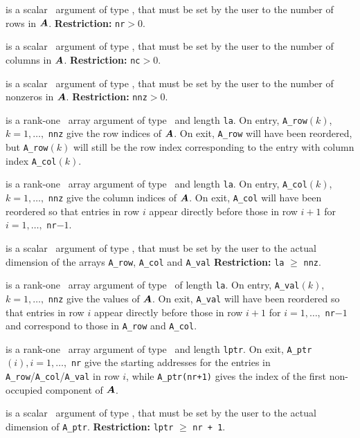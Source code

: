 \documentclass{galahad}
\begin{document}
\begin{description}

 is a scalar \intentin\ argument of type
\integer, that must be set by the user to the number of
rows in ${\bm{A}}$.
{\bf Restriction:} {\tt nr}$ > 0$.

 is a scalar \intentin\ argument of type
\integer, that must be set by the user to the number of
columns in ${\bm{A}}$.
{\bf Restriction:} {\tt nc}$ > 0$.

 is a scalar \intentin\ argument of type
\integer, that must be set by the user to the number of
nonzeros in ${\bm{A}}$.
{\bf Restriction:} {\tt nnz}$ > 0$.

  is a rank-one \intentinout\ array argument of type
\integer\ and length {\tt la}.
On entry, {\tt A\_row}$(k)$, $k = 1, \ldots,$ {\tt nnz} give
the row indices of ${\bm{A}}$. On exit, {\tt A\_row} will have been reordered, but
{\tt A\_row}$(k)$ will still be the row index corresponding to the
entry with column index {\tt A\_col}$(k)$.

  is a rank-one \intentinout\ array argument of type
\integer\ and length {\tt la}.
On entry, {\tt A\_col}$(k)$, $k = 1, \ldots,$ {\tt nnz} give
the column indices of ${\bm{A}}$. On exit, {\tt A\_col}
will have been reordered so that entries in row $i$ appear directly before
those in row $i+1$ for $i = 1, \ldots ,$ {\tt nr}$-1$.

is a scalar \intentin\ argument of type
\integer, that must be set by the user to the actual dimension of the arrays
{\tt A\_row},
{\tt A\_col}
and
{\tt A\_val}
{\bf Restriction:} {\tt la} $\geq$ {\tt nnz}.

is a rank-one \intentinout\ array argument of type
\realdp\ of length {\tt la}.
On entry, {\tt A\_val}$(k)$, $k = 1, \ldots,$ {\tt nnz} give the
values of ${\bm{A}}$.
On exit, {\tt A\_val} will have been reordered so that
entries in row $i$ appear directly before those in row $i+1$ for
$i = 1, \ldots,$ {\tt nr}$-1$ and correspond to those in
{\tt A\_row} and {\tt A\_col}.

  is a rank-one \intentout\ array argument of type
\integer\ and length {\tt lptr}.
On exit, {\tt A\_ptr}$(i), i = 1, \ldots,$ {\tt nr} give
the starting addresses for the entries in {\tt A\_row}/{\tt A\_col}/{\tt A\_val}
in row $i$, while {\tt A\_ptr(nr+1)}
gives the index of the first non-occupied component of ${\bm{A}}$.

 is a scalar \intentin\ argument of type
\integer, that must be set by the user to the
actual dimension of {\tt A\_ptr}.
{\bf Restriction:} {\tt lptr} $\geq$ {\tt nr + 1}.


\end{description}
\end{document}
